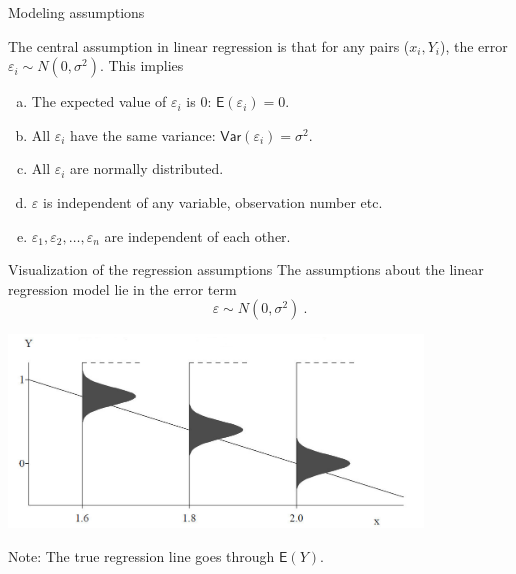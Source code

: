 \documentclass[
  10pt,
  ignorenonframetext,
]{beamer}
\begin{document}
\begin{frame}
\begin{block}{Modeling assumptions}
\protect\hypertarget{modeling-assumptions}{}
\vspace{4mm}

The central assumption in linear regression is that for any pairs
(\(x_i,Y_i\)), the error \(\varepsilon_i \sim N(0,\sigma^2)\). This
implies \vspace{2mm}

\begin{enumerate}
[a)]
\item
  The expected value of \(\varepsilon_i\) is 0:
  \(\mathsf{E}(\varepsilon_i)=0\).
\item
  All \(\varepsilon_i\) have the same variance:
  \(\mathsf{Var}(\varepsilon_i)=\sigma^2\).
\item
  All \(\varepsilon_i\) are normally distributed.
\item
  \(\varepsilon\) is independent of any variable, observation number
  etc.
\item
  \(\varepsilon_1, \varepsilon_2, \ldots, \varepsilon_n\) are
  independent of each other.
\end{enumerate}
\end{block}
\end{frame}

\begin{frame}
\begin{block}{Visualization of the regression assumptions}
\protect\hypertarget{visualization-of-the-regression-assumptions}{}
The assumptions about the linear regression model lie in the error term
\[\varepsilon \sim N(0,\sigma^2) \ . \]

\vspace{-2mm}

\includegraphics[width=11cm]{pictures/regrAssumptions.jpg}

Note: The true regression line goes through \(\mathsf{E}(Y)\).
\end{block}
\end{frame}
\end{document}
